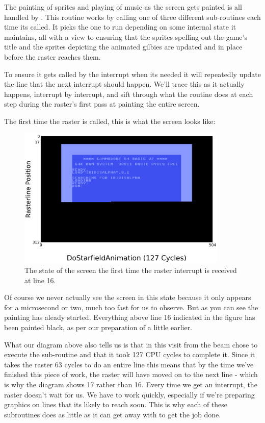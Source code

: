 The painting of sprites and playing of music as the screen gets painted is all handled by .
This routine works by calling one of three different sub-routines each time its called. It picks the one to run
depending on some internal state it maintains, all with a view to ensuring that the sprites spelling out the game's
title and the sprites depicting the animated gilbies are updated and in place before the raster reaches them.

To ensure it gets called by the interrupt when its needed it will repeatedly update the line that the next interrupt
should happen. We'll trace this as it actually happens, interrupt by interrupt, and sift through what the routine
does at each step during the raster's first pass at painting the entire screen.

The first time the raster is called, this is what the screen looks like:

\begin{figure}[H]
    \centering
      \includegraphics[width=10cm]{titlescreen/title1.png}%
\caption{The state of the screen the first time the raster interrupt is received at line 16.}
\end{figure}

Of course we never actually see the screen in this state because it only appears for a microsecond or two, much too
fast for us to observe. But as you can see the painting has aleady started. Everything above line 16 indicated in 
the figure has been painted black, as per our preparation of  a little earlier.

What our diagram above also tells us is that in this visit from the beam  chose to execute
the sub-routine  and that it took 127 CPU cycles to complete it. Since it takes the
raster 63 cycles to do an entire line this means that by the time we've finished this piece of work, the raster will have
moved on to the next line - which is why the diagram shows 17 rather than 16. Every time we get an interrupt, the 
raster doesn't wait for us. We have to work quickly, especially if we're preparing graphics on lines that its likely
to reach soon. This is why each of these subroutines does as little as it can get away with to get the job done.

